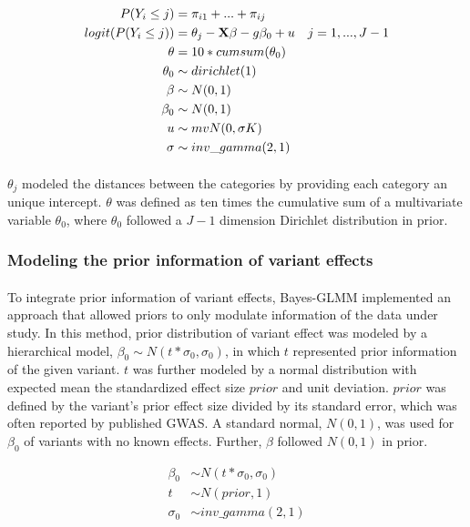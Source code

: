 \documentclass[12pt]{article}
\begin{document}
\begin{align}
  P(Y_i \leq j) & = \pi_{i1} + ... + \pi_{ij} \\
  logit(P(Y_i \leq j) ) & = \theta_j - \bold{X} \beta - g \beta_0 + u \quad j = 1,..., J-1 \\
  \theta & = 10 * cumsum(\theta_0) \\
  \theta_0 & \sim dirichlet(1) \\
   \beta & \sim N(0, 1) \\
   \beta_0 & \sim N(0, 1) \\
   u & \sim mvN(0, \sigma K) \\
   \sigma & \sim inv\_gamma(2, 1)
\end{align}

\paragraph{}{
${\theta_j}$ modeled the distances between the categories by providing each category an unique intercept. $\theta$ was defined as ten times the cumulative sum of a multivariate variable $\theta_0$, where $\theta_0$ followed a $J-1$ dimension Dirichlet distribution in prior. 
}

\subsubsection*{Modeling the prior information of variant effects}

\paragraph{}{
To integrate prior information of variant effects, Bayes-GLMM implemented an approach that allowed priors to only modulate information of the data under study. In this method, prior distribution of variant effect was modeled by a hierarchical model, $\beta_0 \sim N(t * \sigma_0, \sigma_0)$, in which $t$ represented prior information of the given variant. $t$ was further modeled by a normal distribution with expected mean the standardized effect size $prior$ and unit deviation. $prior$ was defined by the variant's prior effect size divided by its standard error, which was often reported by published GWAS. A standard normal, $N(0, 1)$, was used for $\beta_0$ of variants with no known effects. Further, $\beta$ followed $N(0, 1)$ in prior.
}

\begin{align}
   \beta_0 & \sim N( t * \sigma_0, \sigma_0) \\
   t & \sim N(prior, 1) \\
   \sigma_0 & \sim inv\_gamma(2, 1)
\end{align}
\end{document}

